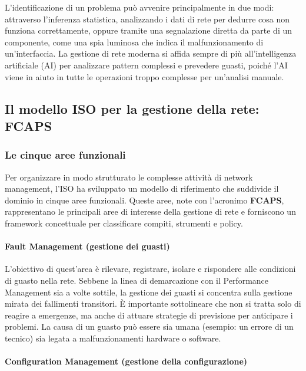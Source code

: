 L'identificazione di un problema può avvenire principalmente in due modi:
attraverso l'inferenza statistica, analizzando i dati di rete per dedurre cosa
non funziona correttamente, oppure tramite una segnalazione diretta da parte di
un componente, come una spia luminosa che indica il malfunzionamento di
un'interfaccia. La gestione di rete moderna si affida sempre di più
all'intelligenza artificiale (AI) per analizzare pattern complessi e prevedere
guasti, poiché l'AI viene in aiuto in tutte le operazioni troppo complesse per
un'analisi manuale.

\subsection{Il modello ISO per la gestione della rete: FCAPS}

\subsubsection{Le cinque aree funzionali}

Per organizzare in modo strutturato le complesse attività di network management,
l'ISO ha sviluppato un modello di riferimento che suddivide il dominio in cinque
aree funzionali. Queste aree, note con l'acronimo \textbf{FCAPS}, rappresentano
le principali aree di interesse della gestione di rete e forniscono un framework
concettuale per classificare compiti, strumenti e policy.

\paragraph{Fault Management (gestione dei guasti)}

L'obiettivo di quest'area è rilevare, registrare, isolare e rispondere alle
condizioni di guasto nella rete. Sebbene la linea di demarcazione con il
Performance Management sia a volte sottile, la gestione dei guasti si concentra
sulla gestione mirata dei fallimenti transitori. È importante sottolineare che
non si tratta solo di reagire a emergenze, ma anche di attuare strategie di
previsione per anticipare i problemi. La causa di un guasto può essere sia umana
(esempio: un errore di un tecnico) sia legata a malfunzionamenti hardware o
software.

\paragraph{Configuration Management (gestione della configurazione)}


